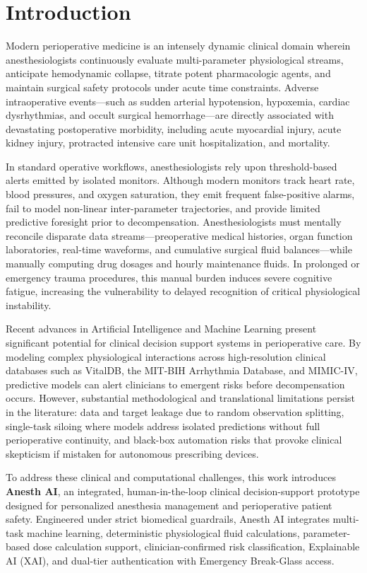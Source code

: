 \documentclass[conference]{IEEEtran}
\begin{document}
\section{Introduction}
Modern perioperative medicine is an intensely dynamic clinical domain wherein anesthesiologists continuously evaluate multi-parameter physiological streams, anticipate hemodynamic collapse, titrate potent pharmacologic agents, and maintain surgical safety protocols under acute time constraints. Adverse intraoperative events---such as sudden arterial hypotension, hypoxemia, cardiac dysrhythmias, and occult surgical hemorrhage---are directly associated with devastating postoperative morbidity, including acute myocardial injury, acute kidney injury, protracted intensive care unit hospitalization, and mortality.

In standard operative workflows, anesthesiologists rely upon threshold-based alerts emitted by isolated monitors. Although modern monitors track heart rate, blood pressures, and oxygen saturation, they emit frequent false-positive alarms, fail to model non-linear inter-parameter trajectories, and provide limited predictive foresight prior to decompensation. Anesthesiologists must mentally reconcile disparate data streams---preoperative medical histories, organ function laboratories, real-time waveforms, and cumulative surgical fluid balances---while manually computing drug dosages and hourly maintenance fluids. In prolonged or emergency trauma procedures, this manual burden induces severe cognitive fatigue, increasing the vulnerability to delayed recognition of critical physiological instability.

Recent advances in Artificial Intelligence and Machine Learning present significant potential for clinical decision support systems in perioperative care. By modeling complex physiological interactions across high-resolution clinical databases such as VitalDB, the MIT-BIH Arrhythmia Database, and MIMIC-IV, predictive models can alert clinicians to emergent risks before decompensation occurs. However, substantial methodological and translational limitations persist in the literature: data and target leakage due to random observation splitting, single-task siloing where models address isolated predictions without full perioperative continuity, and black-box automation risks that provoke clinical skepticism if mistaken for autonomous prescribing devices.

To address these clinical and computational challenges, this work introduces \textbf{Anesth AI}, an integrated, human-in-the-loop clinical decision-support prototype designed for personalized anesthesia management and perioperative patient safety. Engineered under strict biomedical guardrails, Anesth AI integrates multi-task machine learning, deterministic physiological fluid calculations, parameter-based dose calculation support, clinician-confirmed risk classification, Explainable AI (XAI), and dual-tier authentication with Emergency Break-Glass access.
\end{document}
